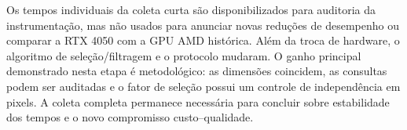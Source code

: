 Os tempos individuais da coleta curta são disponibilizados para auditoria da instrumentação, mas não usados para anunciar novas reduções de desempenho ou comparar a RTX 4050 com a GPU AMD histórica. Além da troca de hardware, o algoritmo de seleção/filtragem e o protocolo mudaram. O ganho principal demonstrado nesta etapa é metodológico: as dimensões coincidem, as consultas podem ser auditadas e o fator de seleção possui um controle de independência em pixels. A coleta completa permanece necessária para concluir sobre estabilidade dos tempos e o novo compromisso custo--qualidade.
